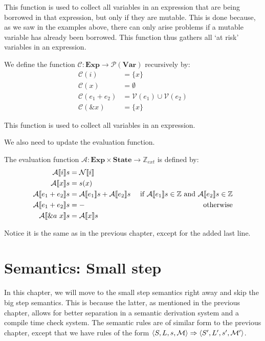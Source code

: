 This function is used to collect all variables in an expression that are being borrowed in that expression, but only if they are mutable. This is done because, as we saw in the examples above, there can only arise problems if a mutable variable has already been borrowed. This function thus gathers all `at risk' variables in an expression. 

\begin{definition}
We define the function $\mathcal{C}: \textbf{Exp} \to \mathcal{P}(\textbf{Var})$ recursively by:
\begin{align*}
    \mathcal{C}(i)          &= \{ x \}
\\  \mathcal{C}(x)          &= \emptyset
\\  \mathcal{C}(e_1 + e_2)  &= \mathcal{V}(e_1) \cup \mathcal{V}(e_2)
\\  \mathcal{C}(\& x)       &= \{ x \}
\end{align*}
\end{definition}

This function is used to collect all variables in an expression. 

We also need to update the evaluation function. 
\begin{definition}
The evaluation function $\mathcal{A}: \textbf{Exp} \times \textbf{State} \to \mathbb{Z}_{ext}$ is defined by:
\begin{align*}
    \mathcal{A} \llbracket i \rrbracket s          &= \mathcal{N} \llbracket i \rrbracket &
\\  \mathcal{A} \llbracket x \rrbracket s          &= s(x) &
\\  \mathcal{A} \llbracket e_1 + e_2 \rrbracket s  &= \mathcal{A} \llbracket e_1 \rrbracket s + \mathcal{A} \llbracket e_2 \rrbracket s & \textrm{ if } \mathcal{A} \llbracket e_1 \rrbracket s \in \mathbb{Z} \textrm{ and } \mathcal{A} \llbracket e_2 \rrbracket s \in \mathbb{Z}
\\  \mathcal{A} \llbracket e_1 + e_2 \rrbracket s  &= - & \textrm{ otherwise}
\\ \mathcal{A} \llbracket \&a~x \rrbracket s       &= \mathcal{A} \llbracket x \rrbracket s &
\end{align*}
\end{definition}
Notice it is the same as in the previous chapter, except for the added last line. 

\section{Semantics: Small step}
In this chapter, we will move to the small step semantics right away and skip the big step semantics. This is because the latter, as mentioned in the previous chapter, allows for better separation in a semantic derivation system and a compile time check system. The semantic rules are of similar form to the previous chapter, except that we have rules of the form $\langle S, L, s, \mathcal{M} \rangle \Rightarrow \langle S', L', s', \mathcal{M'} \rangle$.

